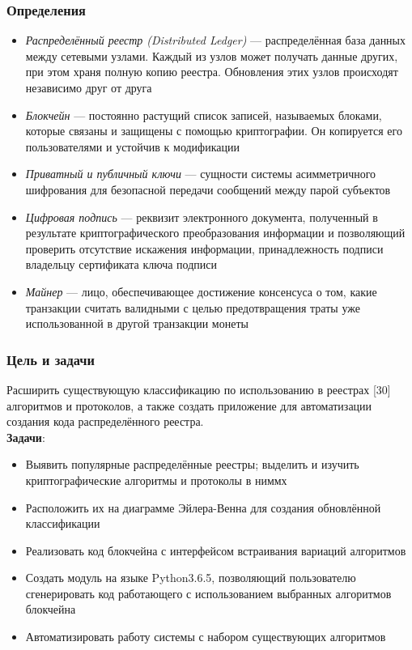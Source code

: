 \documentclass{beamer}
\begin{document}
\begin{frame}
\frametitle{Определения}
\begin{itemize}
\small
    \item \emph{Распределённый реестр (Distributed Ledger)} --- распределённая база
          данных между сетевыми узлами. Каждый из узлов может получать данные
          других, при этом храня полную копию реестра.  Обновления этих
          узлов происходят независимо друг от друга
    \item \emph{Блокчейн} --- постоянно растущий список записей, называемых блоками,
          которые связаны и защищены с помощью криптографии. Он копируется его
          пользователями и устойчив к модификации
    \item \emph{Приватный и публичный ключи} --- сущности системы асимметричного
          шифрования для безопасной передачи сообщений между парой субъектов
    \item \emph{Цифровая подпись} --- реквизит электронного документа, полученный в
          результате криптографического преобразования информации и позволяющий
          проверить отсутствие искажения информации, принадлежность
          подписи владельцу сертификата ключа подписи
    \item \emph{Майнер} --- лицо, обеспечивающее достижение консенсуса о том,
          какие транзакции считать валидными с целью предотвращения траты уже
          использованной в другой транзакции монеты
\end{itemize}
\end{frame}

\begin{frame}[c]
    \small
    \frametitle{Цель и задачи}
    Расширить существующую классификацию по использованию в реестрах
    [30] алгоритмов и протоколов, а также создать приложение для
    автоматизации создания кода распределённого реестра.\\

    {\bfseries \color{HSEblue} Задачи}:
    \begin{itemize}
        \item Выявить популярные распределённые реестры; выделить и изучить
              криптографические алгоритмы и протоколы в ниммх
        \item Расположить их на диаграмме Эйлера-Венна для создания обновлённой
              классификации
        \item Реализовать код блокчейна с интерфейсом встраивания вариаций
              алгоритмов
        \item Создать модуль на языке Python3.6.5, позволяющий пользователю
              сгенерировать код работающего с использованием выбранных
              алгоритмов блокчейна
        \item Автоматизировать работу системы с набором существующих алгоритмов
    \end{itemize}
\end{frame}
\end{document}
